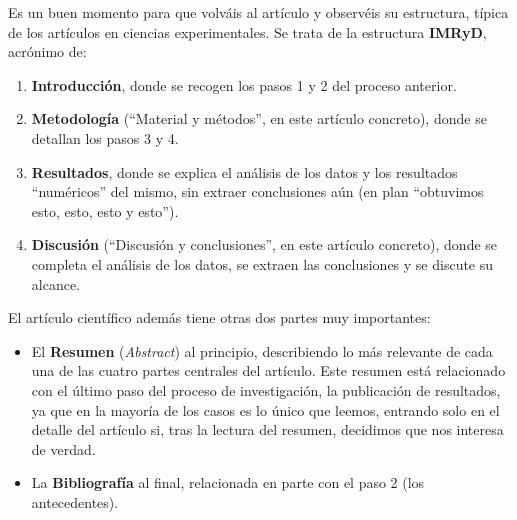 \documentclass[
]{book}
\theoremstyle{definition}
\theoremstyle{definition}
\theoremstyle{definition}
\theoremstyle{definition}
\theoremstyle{remark}
\begin{document}
Es un buen momento para que volváis al artículo y observéis su estructura, típica de los artículos en ciencias experimentales. Se trata de la estructura \textbf{IMRyD}, acrónimo de:

\begin{enumerate}
\def\labelenumi{\arabic{enumi}.}
\item
  \textbf{Introducción}, donde se recogen los pasos 1 y 2 del proceso anterior.
\item
  \textbf{Metodología} (``Material y métodos'', en este artículo concreto), donde se detallan los pasos 3 y 4.
\item
  \textbf{Resultados}, donde se explica el análisis de los datos y los resultados ``numéricos'' del mismo, sin extraer conclusiones aún (en plan ``obtuvimos esto, esto, esto y esto'').
\item
  \textbf{Discusión} (``Discusión y conclusiones'', en este artículo concreto), donde se completa el análisis de los datos, se extraen las conclusiones y se discute su alcance.
\end{enumerate}

El artículo científico además tiene otras dos partes muy importantes:

\begin{itemize}
\item
  El \textbf{Resumen} (\emph{Abstract}) al principio, describiendo lo más relevante de cada una de las cuatro partes centrales del artículo. Este resumen está relacionado con el último paso del proceso de investigación, la publicación de resultados, ya que en la mayoría de los casos es lo único que leemos, entrando solo en el detalle del artículo si, tras la lectura del resumen, decidimos que nos interesa de verdad.
\item
  La \textbf{Bibliografía} al final, relacionada en parte con el paso 2 (los antecedentes).
\end{itemize}
\end{document}
